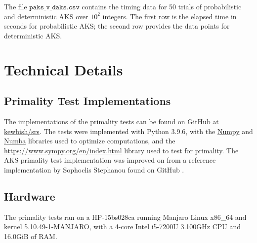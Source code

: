 \documentclass{article}
\begin{document}
\begin{appendices}
The file $\texttt{paks\_v\_daks.csv}$ contains the timing data for 50 trials of probabilistic and deterministic AKS over $10^2$ integers. The first row is the elapsed time in seconds for probabilistic AKS; the second row provides the data points for deterministic AKS.

\section{Technical Details} \label{appendix:tech}

\subsection{Primality Test Implementations}
The implementations of the primality tests can be found on GitHub at \href{https://github.com/kewbish/srs}{kewbish/srs}.
The tests were implemented with Python 3.9.6, with the \href{https://numpy.org/}{Numpy} and \href{http://numba.pydata.org/}{Numba} libraries used to optimize computations, and the \href{Sympy}{https://www.sympy.org/en/index.html} library used to test for primality.
The AKS primality test implementation was improved on from a reference implementation by Sophoclis Stephanou found on GitHub \cite{stephanou_ssophoclis/aks-algorithm:_2020}.

\subsection{Hardware}
The primality tests ran on a HP-15bs028ca running Manjaro Linux x86\_64 and kernel 5.10.49-1-MANJARO, with a 4-core Intel i5-7200U 3.100GHz CPU and 16.0GiB of RAM.

\end{appendices}
\end{document}
